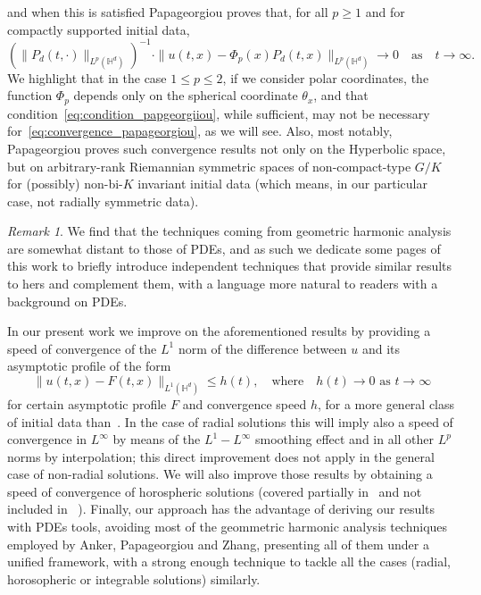 \documentclass[12pt,longbibliography]{article}
\def\H{\mathbb{H}}
\theoremstyle{definition}
\theoremstyle{remark}
\newtheorem{rem}[thm]{Remark}
\theoremstyle{example}
\begin{document}
and when this is satisfied Papageorgiou proves that, for all $p\geq 1$ and for compactly supported initial data,
\begin{equation}\label{eq:convergence_papageorgiou}
(\|P_d(t,\cdot)\|_{L^p(\H^d)})^{-1}\cdot \|u(t,x)-\Phi_p(x)P_d(t,x)\|_{L^p(\H^d)}\to 0\quad\text{as}\quad t\to\infty.
\end{equation}
We highlight that in the case $1\leq p\leq 2$, if we consider polar coordinates, the function $\Phi_p$ depends only on the spherical coordinate $\theta_x$, and that condition~\eqref{eq:condition_papgeorgiiou}, while sufficient, may not be necessary for~\eqref{eq:convergence_papageorgiou}, as we will see. Also, most notably, Papageorgiou proves such convergence results not only on the Hyperbolic space, but on
arbitrary-rank Riemannian symmetric spaces of non-compact-type $G/K$ for (possibly) non-bi-$K$ invariant initial data (which means, in our particular case, not radially symmetric data). 

\begin{rem}
	We find that the techniques coming from geometric harmonic analysis are somewhat distant to those of PDEs, and as such we dedicate some pages of this work to briefly introduce independent techniques that provide similar results to hers and complement them, with a language more natural to readers with a background on PDEs.
\end{rem}

In our present work we improve on the aforementioned results by providing a speed of convergence of the $L^1$ norm of the difference between $u$ and its asymptotic profile of the form
\[
\|u(t,x)-F(t,x)\|_{L^1(\H^d)}\leq h(t), \quad\text{where}\quad h(t)\to 0 \text{ as } t\to\infty
\]
for certain asymptotic profile $F$ and convergence speed $h$, for a more general class of initial data than~\cite{Papageorgiou2025}. In the case of radial solutions this will imply also a speed of convergence in $L^\infty$ by means of the $L^1-L^\infty$ smoothing effect and in all other $L^p$ norms by interpolation; this direct improvement does not apply in the general case of non-radial solutions. We will also improve those results by obtaining a speed of convergence of horospheric solutions (covered partially in~\cite{vazquez1992asymptotic} and not included in ~\cite{Papageorgiou2025}). Finally, our approach has the advantage of deriving our results with PDEs tools, avoiding most of the geommetric harmonic analysis techniques employed by Anker, Papageorgiou and Zhang, presenting all of them under a unified framework, with a strong enough technique to tackle all the cases (radial, horosopheric or integrable solutions) similarly. 
\end{document}
